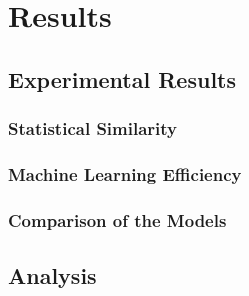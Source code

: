\chapter{Results}
\label{ch:results}
\section{Experimental Results}
\label{ch:results-experimentalResults}

\subsection{Statistical Similarity}
\label{ch:results-experimentalResults-statisticalSimilarity}

\subsection{Machine Learning Efficiency}
\label{ch:results-experimentalResults-machineLearningEfficiency}

\subsection{Comparison of the Models}
\label{ch:results-experimentalResults-comparisonOfTheModels}
\section{Analysis}
\label{ch:results-analysis}


